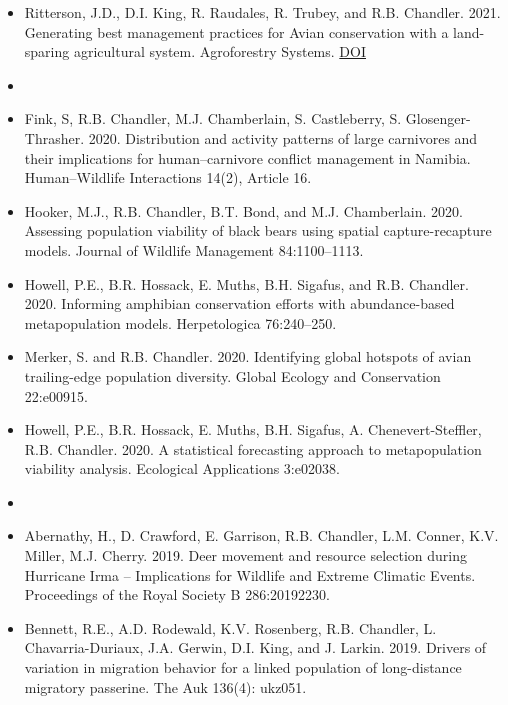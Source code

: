 \documentclass[12pt]{article}
\begin{document}
\begin{itemize}
\item Ritterson, J.D., D.I. King, R. Raudales, R. Trubey, and
  R.B. Chandler. 2021. Generating best management practices for Avian
  conservation with a land-sparing agricultural system. Agroforestry
  Systems. \href{https://doi.org/10.1007/s10457-020-00582-7}{DOI}
  
  
\item[] { \\}

\item Fink, S, R.B. Chandler, M.J. Chamberlain, S. Castleberry,
  S. Glosenger-Thrasher. 2020. Distribution and activity patterns of 
  large carnivores and their implications for human–carnivore conflict 
  management in Namibia. Human–Wildlife Interactions 14(2), Article 16.    

\item Hooker, M.J., R.B. Chandler, B.T. Bond, and
  M.J. Chamberlain. 2020. Assessing population viability of black
  bears using spatial capture-recapture models. Journal of Wildlife
  Management 84:1100--1113.  
  
\item Howell, P.E., B.R. Hossack, E. Muths, B.H. Sigafus, and
  R.B. Chandler. 2020. Informing amphibian conservation efforts
  with abundance-based metapopulation models. Herpetologica 76:240--250. 

\item Merker, S. and R.B. Chandler. 2020. Identifying global hotspots
  of avian trailing-edge population diversity. Global Ecology and
  Conservation 22:e00915.   

\item Howell, P.E., B.R. Hossack, E. Muths, B.H. Sigafus,
  A. Chenevert-Steffler, R.B. Chandler. 2020. A statistical 
  forecasting approach to metapopulation viability
  analysis. Ecological Applications 3:e02038. 

  
\item[] { \\}

\item Abernathy, H., D. Crawford, E. Garrison, R.B. Chandler,
  L.M. Conner, K.V. Miller, M.J. Cherry. 2019. Deer movement and
  resource selection during Hurricane Irma -- Implications for
  Wildlife and Extreme Climatic Events. Proceedings of the Royal
  Society B 286:20192230. 
  
\item Bennett, R.E., A.D. Rodewald, K.V. Rosenberg, R.B. Chandler,
  L. Chavarria-Duriaux, J.A. Gerwin, D.I. King, and
  J. Larkin. 2019. Drivers of variation in migration behavior for a
  linked population of long-distance migratory passerine. The Auk
  136(4): ukz051.
  

\end{itemize}
\end{document}

